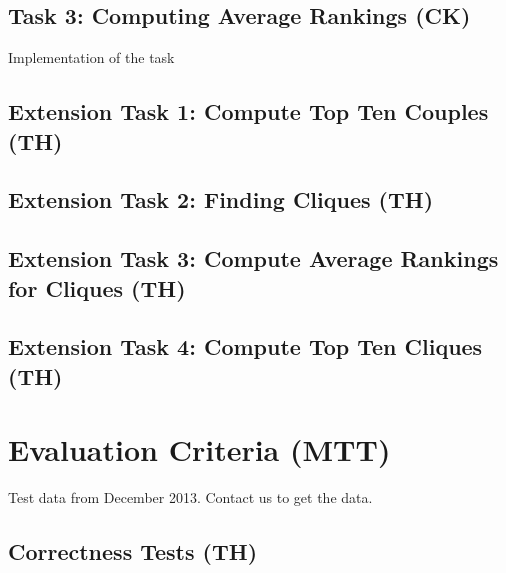 \documentclass[a4paper]{article}
\begin{document}
\subsection{Task 3: Computing Average Rankings (CK)}


Implementation of the task

\subsection{Extension Task 1: Compute Top Ten Couples (TH)}

\subsection{Extension Task 2: Finding Cliques (TH)}


\subsection{Extension Task 3: Compute Average Rankings for Cliques (TH)}

\subsection{Extension Task 4: Compute Top Ten Cliques (TH)}



\section{Evaluation Criteria (MTT)}\label{sec-eval}

Test data from December 2013. Contact us to get the data.

\subsection{Correctness Tests (TH)}
\end{document}
